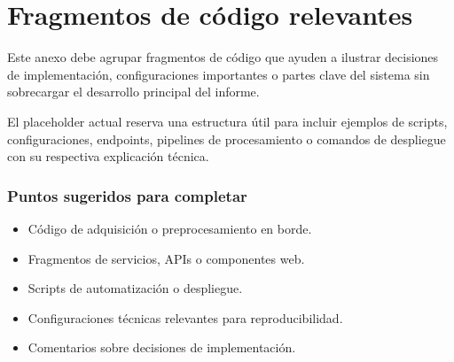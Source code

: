 \chapter{Fragmentos de código relevantes}

Este anexo debe agrupar fragmentos de código que ayuden a ilustrar decisiones de
implementación, configuraciones importantes o partes clave del sistema sin sobrecargar
el desarrollo principal del informe.

El placeholder actual reserva una estructura útil para incluir ejemplos de scripts,
configuraciones, endpoints, pipelines de procesamiento o comandos de despliegue con su
respectiva explicación técnica.

\subsection*{Puntos sugeridos para completar}
\begin{itemize}[leftmargin=*]
  \item Código de adquisición o preprocesamiento en borde.
  \item Fragmentos de servicios, APIs o componentes web.
  \item Scripts de automatización o despliegue.
  \item Configuraciones técnicas relevantes para reproducibilidad.
  \item Comentarios sobre decisiones de implementación.
\end{itemize}
